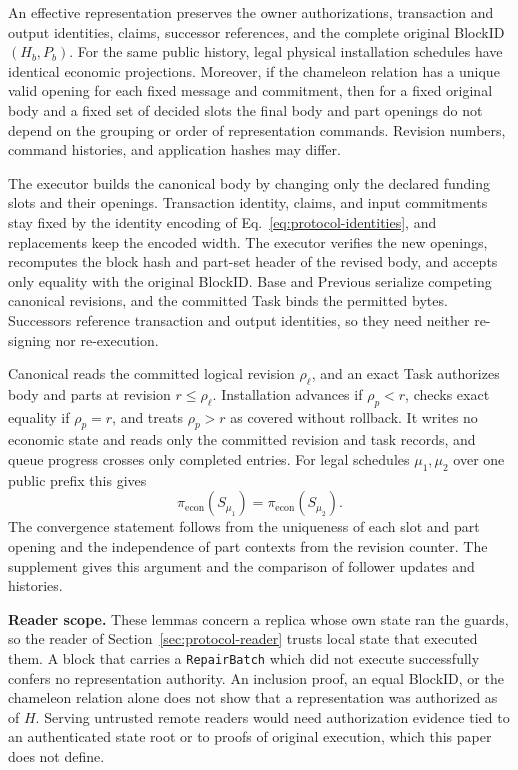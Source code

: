 \begin{lemma}
\label{lem:security-installation}
An effective representation preserves the owner authorizations,
transaction and output identities, claims, successor references, and the
complete original BlockID $(H_b,P_b)$. For the same public history, legal
physical installation schedules have identical economic projections.
Moreover, if the chameleon relation has a unique valid opening for each
fixed message and commitment, then for a fixed original body and a fixed
set of decided slots the final body and part openings do not depend on
the grouping or order of representation commands. Revision numbers,
command histories, and application hashes may differ.
\end{lemma}
\begin{IEEEproof}
The executor builds the canonical body by changing only the declared funding slots and their openings. Transaction identity, claims, and input commitments stay fixed by the identity encoding of Eq.~\eqref{eq:protocol-identities}, and replacements keep the encoded width. The executor verifies the new openings, recomputes the block hash and part-set header of the revised body, and accepts only equality with the original BlockID. Base and Previous serialize competing canonical revisions, and the committed Task binds the permitted bytes. Successors reference transaction and output identities, so they need neither re-signing nor re-execution.

Canonical reads the committed logical revision $\rho_\ell$, and an exact Task authorizes body and parts at revision $r\le\rho_\ell$. Installation advances if $\rho_p<r$, checks exact equality if $\rho_p=r$, and treats $\rho_p>r$ as covered without rollback. It writes no economic state and reads only the committed revision and task records, and queue progress crosses only completed entries. For legal schedules $\mu_1,\mu_2$ over one public prefix this gives
\begin{equation}
 \pi_{\mathrm{econ}}(S_{\mu_1})=\pi_{\mathrm{econ}}(S_{\mu_2}).
 \label{eq:security-installation}
\end{equation}
The convergence statement follows from the uniqueness of each slot and part opening and the independence of part contexts from the revision counter. The supplement gives this argument and the comparison of follower updates and histories.
\end{IEEEproof}

\noindent\textbf{Reader scope.}
These lemmas concern a replica whose own state ran the guards, so the reader of Section~\ref{sec:protocol-reader} trusts local state that executed them. A block that carries a \texttt{RepairBatch} which did not execute successfully confers no representation authority. An inclusion proof, an equal BlockID, or the chameleon relation alone does not show that a representation was authorized as of $H$. Serving untrusted remote readers would need authorization evidence tied to an authenticated state root or to proofs of original execution, which this paper does not define.


